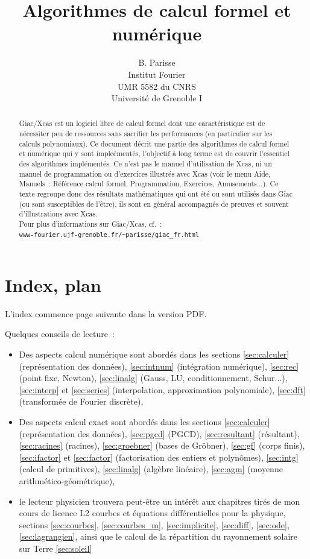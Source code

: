 \documentclass[a4paper,11pt]{article}
\title {Algorithmes de calcul formel et num\'erique}
\author{B. Parisse\\Institut Fourier\\UMR 5582 du CNRS
\\Université de Grenoble I}
\date{}
\begin{document}
\maketitle

\begin{abstract}
Giac/Xcas est un logiciel libre de calcul formel dont
une caract\'eristique est de n\'ecessiter peu de ressources sans
sacrifier les performances (en particulier sur les calculs polynomiaux).
 Ce document d\'ecrit une partie des algorithmes de calcul formel et
 num\'erique qui y sont
imple\'ement\'es, l'objectif \`a long terme
est de couvrir l'essentiel des algorithmes impl\'ement\'es.
Ce n'est pas le manuel d'utilisation de Xcas, ni un manuel de programmation
ou d'exercices illustr\'es avec Xcas (voir le menu Aide, Manuels~:
R\'ef\'erence calcul formel, Programmation, Exercices, Amusements...).
Ce texte regroupe donc des r\'esultats
math\'ematiques qui ont \'et\'e ou sont utilis\'es dans Giac
(ou sont susceptibles de l'\^etre),
ils sont en g\'en\'eral accompagn\'es de preuves 
et souvent d'illustrations avec Xcas.\\
Pour plus d'informations sur Giac/Xcas, cf.~:\\
\verb|www-fourier.ujf-grenoble.fr/~parisse/giac_fr.html|
\end{abstract}

\tableofcontents 


\section{Index, plan} \label{sec:index}
L'index commence page suivante dans la version PDF.

Quelques conseils de lecture~:
\begin{itemize}
\item Des aspects calcul num\'erique sont abord\'es dans les sections
\ref{sec:calculer} (repr\'esentation des donn\'ees), 
\ref{sec:intnum} (int\'egration num\'erique),
\ref{sec:rec} (point fixe, Newton), \ref{sec:linalg} (Gauss, LU,
conditionnement, Schur...), \ref{sec:interp} et \ref{sec:series}
(interpolation, approximation polynomiale),
\ref{sec:dft} (transform\'ee de Fourier discr\`ete),
\item Des aspects calcul exact sont abord\'es dans les sections
\ref{sec:calculer} (repr\'esentation des donn\'ees), 
\ref{sec:pgcd} (PGCD), \ref{sec:resultant}
(r\'esultant), \ref{sec:racines} (racines), \ref{sec:groebner}
(bases de Gr\"obner), \ref{sec:gf} (corps
finis), \ref{sec:ifactor}
et \ref{sec:factor} (factorisation des entiers et polyn\^omes),
\ref{sec:intg} (calcul de primitives), \ref{sec:linalg} (alg\`ebre
lin\'eaire), \ref{sec:agm} (moyenne
arithm\'etico-g\'eom\'etrique), 
\item le lecteur physicien trouvera peut-\^etre un int\'er\^et
aux chapitres tir\'es de mon cours de licence L2 courbes et
\'equations diff\'erentielles pour la physique,
sections \ref{sec:courbes},
\ref{sec:courbes_m}, \ref{sec:implicite}, \ref{sec:diff},
\ref{sec:ode}, \ref{sec:lagrangien}, ainsi que le calcul de la
r\'epartition du rayonnement solaire sur Terre \ref{sec:soleil}
\end{itemize}
\printindex
\end{document}
